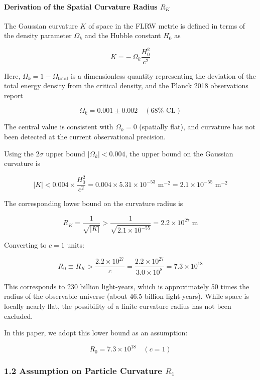 \documentclass[
  a4paper,11pt]{article}
\theoremstyle{definition}
\theoremstyle{remark}
\begin{document}
\paragraph{\texorpdfstring{Derivation of the Spatial Curvature Radius
\(R_K\)}{Derivation of the Spatial Curvature Radius R\_K}}\label{derivation-of-the-spatial-curvature-radius-r_k}

The Gaussian curvature \(K\) of space in the FLRW metric is defined in
terms of the density parameter \(\Omega_k\) and the Hubble constant
\(H_0\) as

\[K = -\,\Omega_k \frac{H_0^2}{c^2}\]

Here, \(\Omega_k = 1 - \Omega_{\mathrm{total}}\) is a dimensionless
quantity representing the deviation of the total energy density from the
critical density, and the Planck 2018 observations report

\[\Omega_k = 0.001 \pm 0.002 \quad (68\% \text{ CL})\]

The central value is consistent with \(\Omega_k = 0\) (spatially flat),
and curvature has not been detected at the current observational
precision.

Using the \(2\sigma\) upper bound \(\lvert \Omega_k \rvert < 0.004\),
the upper bound on the Gaussian curvature is

\[\lvert K \rvert < 0.004 \times \frac{H_0^2}{c^2} = 0.004 \times 5.31 \times 10^{-53} \text{ m}^{-2} = 2.1 \times 10^{-55} \text{ m}^{-2}\]

The corresponding lower bound on the curvature radius is

\[R_K = \frac{1}{\sqrt{\lvert K \rvert}} > \frac{1}{\sqrt{2.1 \times 10^{-55}}} = 2.2 \times 10^{27} \text{ m}\]

Converting to \(c = 1\) units:

\[R_0 \equiv R_K > \frac{2.2 \times 10^{27}}{c} = \frac{2.2 \times 10^{27}}{3.0 \times 10^{8}} = 7.3 \times 10^{18}\]

This corresponds to 230 billion light-years, which is approximately 50
times the radius of the observable universe (about 46.5 billion
light-years). While space is locally nearly flat, the possibility of a
finite curvature radius has not been excluded.

In this paper, we adopt this lower bound as an assumption:

\[R_0 = 7.3 \times 10^{18} \quad (c = 1)\]

\subsubsection{\texorpdfstring{1.2 Assumption on Particle Curvature
\(R_1\)}{1.2 Assumption on Particle Curvature R\_1}}\label{assumption-on-particle-curvature-r_1}
\end{document}
